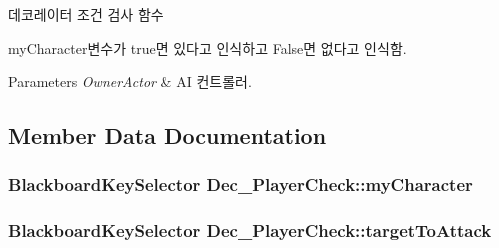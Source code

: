 데코레이터 조건 검사 함수 

my\+Character변수가 true면 있다고 인식하고 False면 없다고 인식함. 
\begin{DoxyParams}{Parameters}
{\em Owner\+Actor} & AI 컨트롤러. \\
\hline
\end{DoxyParams}


\subsection{Member Data Documentation}
\subsubsection[{\texorpdfstring{my\+Character}{myCharacter}}]{\setlength{\rightskip}{0pt plus 5cm}Blackboard\+Key\+Selector Dec\+\_\+\+Player\+Check\+::my\+Character}\hypertarget{class_dec___player_check_a3251552a2d0c5c80aa8dea038622f0cb}{}\label{class_dec___player_check_a3251552a2d0c5c80aa8dea038622f0cb}
\subsubsection[{\texorpdfstring{target\+To\+Attack}{targetToAttack}}]{\setlength{\rightskip}{0pt plus 5cm}Blackboard\+Key\+Selector Dec\+\_\+\+Player\+Check\+::target\+To\+Attack}\hypertarget{class_dec___player_check_ad28098e77833bb97a082bb3c7e79c5f4}{}\label{class_dec___player_check_ad28098e77833bb97a082bb3c7e79c5f4}
